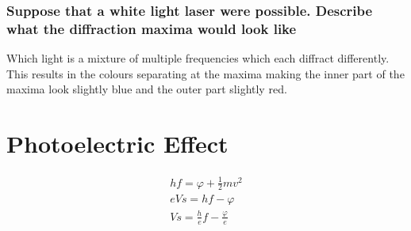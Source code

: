 \documentclass{article}
\begin{document}
\subsubsection{Suppose that a white light laser were possible. Describe what
	the diffraction maxima would look like}

Which light is a mixture of multiple frequencies which each diffract
differently. This results in the colours separating at the maxima making
the inner part of the maxima look slightly blue and the outer part slightly
red.

\break

\section{Photoelectric Effect}

\begin{gather}
	hf = \varphi + \frac{1}{2} mv^2 \\
	eVs = hf - \varphi \\
	Vs = \frac{h}{e}f - \frac{\varphi}{e}
\end{gather}
\end{document}
